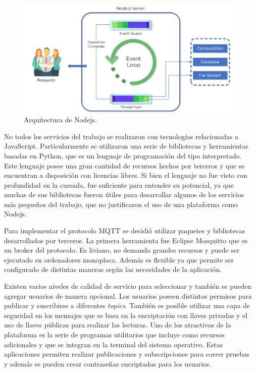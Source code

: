 \begin{figure}[h]
	\centering
	\includegraphics[width=\textwidth]{./Figures/ch2Nodejs.jpeg}
	\caption{Arquitectura de Nodejs. \citep{WEBSITE:nodejs}}
	\label{fig:ch2Nodejs}
\end{figure}

No todos los servicios del trabajo se realizaron con tecnologías relacionadas a JavaScript.
Particularmente se utilizaron una serie de bibliotecas y herramientas basadas en Python, que es un lenguaje de programación del tipo interpretado.
Este lenguaje posee una gran cantidad de recursos hechos por terceros y que se encuentran a disposición con licencias libres.
Si bien el lenguaje no fue visto con profundidad en la cursada, fue suficiente para entender su potencial, ya que muchas de sus bibliotecas fueron útiles para desarrollar algunos de los servicios más pequeños del trabajo, que no justificaron el uso de una plataforma como Nodejs.

Para implementar el protocolo MQTT se decidió utilizar paquetes y bibliotecas desarrollados por terceros.
La primera herramienta fue Eclipse Mosquitto que es un broker del protocolo.
Es liviano, no demanda grandes recursos y puede ser ejecutado en ordenadores monoplaca.
Además es flexible ya que permite ser configurado de distintas maneras según las necesidades de la aplicación.

Existen varios niveles de calidad de servicio para seleccionar y también se pueden agregar usuarios de manera opcional.
Los usuarios poseen distintos permisos para publicar y suscribirse a diferentes \emph{topics}.
También es posible utilizar una capa de seguridad en los mensajes que se basa en la encriptación con llaves privadas y el uso de llaves públicas para realizar las lecturas.
Uno de los atractivos de la plataforma es la serie de programas utilitarios que incluye como recursos adicionales y que se integran en la terminal del sistema operativo.
Estas aplicaciones permiten realizar publicaciones y subscripciones para correr pruebas y además se pueden crear contraseñas encriptadas para los usuarios.

